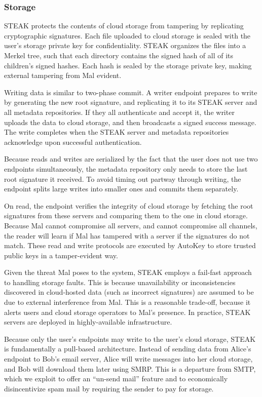 \subsubsection{Storage}
STEAK protects the contents of cloud storage from tampering by replicating cryptographic signatures.  Each file uploaded to cloud storage is sealed with the user’s storage private key for confidentiality.  STEAK organizes the files into a Merkel tree, such that each directory contains the signed hash of all of its children’s signed hashes.  Each hash is sealed by the storage private key, making external tampering from Mal evident.

Writing data is similar to two-phase commit.  A writer endpoint prepares to write by generating the new root signature, and replicating it to its STEAK server and all metadata repositories.  If they all authenticate and accept it, the writer uploads the data to cloud storage, and then broadcasts a signed success message.  The write completes when the STEAK server and metadata repositories acknowledge upon successful authentication.

Because reads and writes are serialized by the fact that the user does not use two endpoints simultaneously, the metadata repository only needs to store the last root signature it received.  To avoid timing out partway through writing, the endpoint splits large writes into smaller ones and commits them separately.

On read, the endpoint verifies the integrity of cloud storage by fetching the root signatures from these servers and comparing them to the one in cloud storage.  Because Mal cannot compromise all servers, and cannot compromise all channels, the reader will learn if Mal has tampered with a server if the signatures do not match.  These read and write protocols are executed by AutoKey to store trusted public keys in a tamper-evident way.

Given the threat Mal poses to the system, STEAK employs a fail-fast approach to handling storage faults.  This is because unavailability or inconsistencies discovered in cloud-hosted data (such as incorrect signatures) are assumed to be due to external interference from Mal.  This is a reasonable trade-off, because it alerts users and cloud storage operators to Mal’s presence.  In practice, STEAK servers are deployed in highly-available infrastructure.

Because only the user’s endpoints may write to the user’s cloud storage, STEAK is fundamentally a pull-based architecture.  Instead of sending data from Alice’s endpoint to Bob’s email server, Alice will write messages into her cloud storage, and Bob will download them later using SMRP.  This is a departure from SMTP, which we exploit to offer an ``un-send mail'' feature and to economically disincentivize spam mail by requiring the sender to pay for storage.

